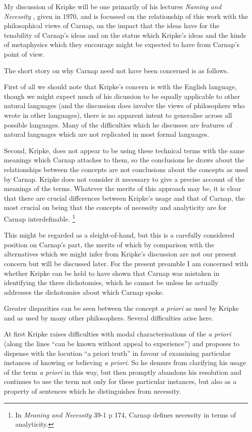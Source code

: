 My discussion of Kripke will be one primarily of his lectures
\emph{Naming and Necessity} \cite{Kripke72}, given in 1970, and is focussed
on the relationship of this work with the philosophical views of Carnap, on
the impact that the ideas have for the tenability of Carnap's ideas
and on the status which Kripke's ideas and the kinds of metaphysics which
they encourage might be expected to have from Carnap's point of view.

The short story on why Carnap need not have been concerned is as follows.

First of all we should note that Kripke's concern is with the English
language, though we might expect much of his dicussion to be equally
applicable to other natural languages (and the discussion does involve
the views of philosophers who wrote in other languages), there is no
apparent intent to generalise across all possible languages.
Many of the difficulties which he discusses are features of natural
languages which are not replicated in most formal languages.

Second, Kripke, does not appear to be using these technical terms
with the same meanings which Carnap attaches to them, so the conclusions
he draws about the relationships between the concepts are not
conclusions about the concepts as used by Carnap.
Kripke does not consider it necessary to give a precise account
of the meanings of the terms.
Whatever the merits of this approach may be, it is clear that there are
crucial differences between Kripke's usage and that of Carnap, the most
crucial on being that the concepts of necessity and analyticity are for
Carnap interdefinable.
\footnote{In \emph{Meaning and Necessity} \cite{carnap47} 39-1 p 174, Carnap defines necessity in terms
of analyticity.}

This might be regarded as a sleight-of-hand, but this is a carefully
considered position on Carnap's part, the merits of which by comparison
with the alternatives which we might infer from Kripke's discussion are
not our present concern but will be discussed later.
For the present preamble I am concerned with whether Kripke can be held
to have shown that Carnap was mistaken in identifying the three dichotomies,
which he cannot be unless he actually addresses the dichotomies about
which Carnap spoke.

Greater disparities can be seen between the concept \emph{a priori} as used
by Kripke and as used by many other philosophers.
Several difficulties arise here.

At first Kripke raises difficulties with modal characterisations of the
\emph{a priori} (along the lines ``can be known without appeal to experience'')
and proposes to dispense with the locution ``a priori truth'' in favour
of examining particular instances of knowing or believing \emph{a priori}.
So he demurs from clarifying his usage of the term \emph{a priori} in this
way, but then promptly abandons his resolution and continues to use the
term not only for these particular instances, but also as a property of
sentences which he distinguishes from necessity.


